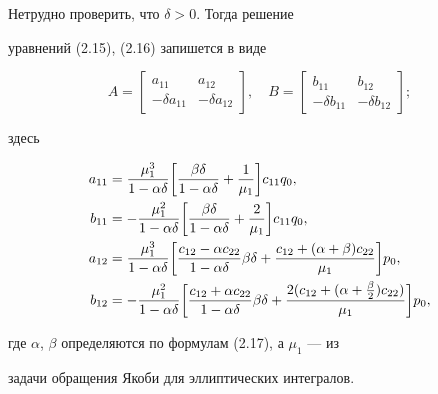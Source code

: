 Нетрудно проверить, что $\delta>0$. Тогда решение 


уравнений (2.15), (2.16) запишется в виде 


$$ 


A= \begin{bmatrix} 


a_{11} & a_{12} \\ -\delta a_{11} & -\delta a_{12} 


\end{bmatrix} 


,\quad B=\begin{bmatrix} 


b_{11} & b_{12} \\ -\delta b_{11} & -\delta b_{12} 


\end{bmatrix}; 


$$ 


здесь 


\begin{align} 


a_{11}&=\frac{\mu^3_1}{1-\alpha\delta}\bigg[ 


\frac{\beta\delta}{1-\alpha\delta}+\frac{1}{\mu_1}\bigg] 


c_{11}q_0, \notag \\ 


b_{11}&=-\frac{\mu^2_1}{1-\alpha\delta}\bigg[ 


\frac{\beta\delta}{1-\alpha\delta}+\frac{2}{\mu_1}\bigg] 


c_{11}q_0,\notag \\ 


a_{12}&=\frac{\mu^3_1}{1-\alpha\delta}\bigg[ 


\frac{c_{12}-\alpha c_{22}}{1-\alpha\delta}\beta\delta+ 


\frac{c_{12}+(\alpha+\beta)c_{22}}{\mu_1}\bigg]p_0, \\ 


b_{12}&=-\frac{\mu^2_1}{1-\alpha\delta}\bigg[ 


\frac{c_{12}+\alpha c_{22}}{1-\alpha\delta}\beta\delta+ 


\frac{2(c_{12}+(\alpha+\frac{\beta}{2})c_{22})} 


{\mu_1}\bigg]p_0,\notag 


\end{align} 


где $\alpha$, $\beta$ определяются по формулам (2.17), а $\mu_1$ --- из 


задачи обращения Якоби для эллиптических интегралов. 


